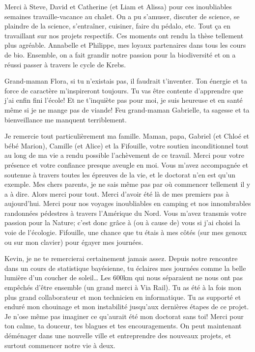 Merci à Steve, David et Catherine (et Liam et Alissa) pour ces
inoubliables semaines travaille-vacance au chalet. On a pu s'amuser,
discuter de science, se plaindre de la science, s'entraîner, cuisiner,
faire du pédalo, etc. Tout ça en travaillant sur nos projets respectifs.
Ces moments ont rendu la thèse tellement plus agréable. Annabelle et
Philippe, mes loyaux partenaires dans tous les cours de bio. Ensemble,
on a fait grandir notre passion pour la biodiversité et on a réussi
passer à travers le cycle de Krebs.

Grand-maman Flora, si tu n'existais pas, il faudrait t'inventer. Ton
énergie et ta force de caractère m'inspireront toujours. Tu vas être
contente d'apprendre que j'ai enfin fini l'école! Et ne t'inquiète pas
pour moi, je suis heureuse et en santé même si je ne mange pas de
viande! Feu grand-maman Gabrielle, ta sagesse et ta bienveillance me
manquent terriblement.

Je remercie tout particulièrement ma famille. Maman, papa, Gabriel (et
Chloé et bébé Marion), Camille (et Alice) et la Fifouille, votre soutien
inconditionnel tout au long de ma vie a rendu possible l'achèvement de
ce travail. Merci pour votre présence et votre confiance presque aveugle
en moi. Vous m'avez accompagnée et soutenue à travers toutes les
épreuves de la vie, et le doctorat n'en est qu'un exemple. Mes chers
parents, je ne sais même pas par où commencer tellement il y a à dire.
Alors merci pour tout. Merci d'avoir été là de mes premiers pas à
aujourd'hui. Merci pour nos voyages inoubliables en camping et nos
innombrables randonnées pédestres à travers l'Amérique du Nord. Vous
m'avez transmis votre passion pour la Nature; c'est donc grâce à (ou à
cause de) vous si j'ai choisi la voie de l'écologie. Fifouille, une
chance que tu étais à mes côtés (sur mes genoux ou sur mon clavier) pour
égayer mes journées.

Kevin, je ne te remercierai certainement jamais assez. Depuis notre
rencontre dans un cours de statistique bayésienne, tu éclaires mes
journées comme la belle lumière d'un coucher de soleil\ldots{} Les 600km
qui nous séparaient ne nous ont pas empêchés d'être ensemble (un grand
merci à Via Rail). Tu as été à la fois mon plus grand collaborateur et
mon technicien en informatique. Tu as supporté et enduré mon chouinage
et mon instabilité jusqu'aux dernières étapes de ce projet. Je n'ose
même pas imaginer ce qu'aurait été mon doctorat sans toi! Merci pour ton
calme, ta douceur, tes blagues et tes encouragements. On peut maintenant
déménager dans une nouvelle ville et entreprendre des nouveaux projets,
et surtout commencer notre vie à deux.
